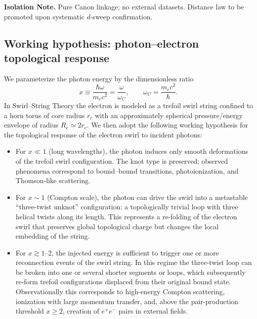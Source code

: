 \documentclass[10pt,reprint,aps,onecolumn,nofootinbib]{revtex4-2}
\begin{document}
        \textbf{Isolation Note.}
        Pure Canon linkage; no external datasets. Distance law to be promoted upon systematic $d$-sweep confirmation.


    \subsection{Working hypothesis: photon--electron topological response}

        We parameterize the photon energy by the dimensionless ratio
        \begin{equation}
            x \equiv \frac{\hbar\omega}{m_e c^2}
            = \frac{\omega}{\omega_C},
            \qquad
            \omega_C = \frac{m_e c^2}{\hbar}.
        \end{equation}
        In Swirl--String Theory the electron is modeled as a trefoil swirl string
        confined to a horn torus of core radius $r_c$ with an approximately
        spherical pressure/energy envelope of radius $R_e\simeq 2 r_c$.  We then
        adopt the following working hypothesis for the topological response of
        the electron swirl to incident photons:

        \begin{itemize}
            \item For $x \ll 1$ (long wavelengths), the photon induces only
            smooth deformations of the trefoil swirl configuration.  The
            knot type is preserved; observed phenomena correspond to
            bound--bound transitions, photoionization, and Thomson-like
            scattering.
            \item For $x \sim 1$ (Compton scale), the photon can drive the swirl
            into a metastable ``three-twist unknot'' configuration: a
            topologically trivial loop with three helical twists along its
            length.  This represents a re-folding of the electron swirl
            that preserves global topological charge but changes the local
            embedding of the string.
            \item For $x \gtrsim 1$--2, the injected energy is sufficient to
            trigger one or more reconnection events of the swirl string.
            In this regime the three-twist loop can be broken into one or
            several shorter segments or loops, which subsequently re-form
            trefoil configurations displaced from their original bound
            state.  Observationally this corresponds to high-energy
            Compton scattering, ionization with large momentum transfer,
            and, above the pair-production threshold $x\ge 2$, creation of
            $e^+e^-$ pairs in external fields.
        \end{itemize}
\end{document}
